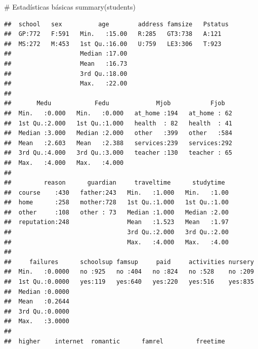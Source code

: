 \documentclass[]{article}
\newenvironment{Shaded}{\begin{snugshade}}{\end{snugshade}}
\newcommand{\CommentTok}[1]{\textcolor[rgb]{0.50,0.62,0.50}{#1}}
\newcommand{\KeywordTok}[1]{\textcolor[rgb]{0.94,0.87,0.69}{#1}}
\newcommand{\NormalTok}[1]{\textcolor[rgb]{0.80,0.80,0.80}{#1}}
\begin{document}
\begin{Shaded}
\begin{Highlighting}[]
\CommentTok{# Estadísticas básicas}
\KeywordTok{summary}\NormalTok{(students)}
\end{Highlighting}
\end{Shaded}

\begin{verbatim}
##  school   sex          age        address famsize   Pstatus
##  GP:772   F:591   Min.   :15.00   R:285   GT3:738   A:121  
##  MS:272   M:453   1st Qu.:16.00   U:759   LE3:306   T:923  
##                   Median :17.00                            
##                   Mean   :16.73                            
##                   3rd Qu.:18.00                            
##                   Max.   :22.00                            
##                                                            
##       Medu            Fedu             Mjob           Fjob    
##  Min.   :0.000   Min.   :0.000   at_home :194   at_home : 62  
##  1st Qu.:2.000   1st Qu.:1.000   health  : 82   health  : 41  
##  Median :3.000   Median :2.000   other   :399   other   :584  
##  Mean   :2.603   Mean   :2.388   services:239   services:292  
##  3rd Qu.:4.000   3rd Qu.:3.000   teacher :130   teacher : 65  
##  Max.   :4.000   Max.   :4.000                                
##                                                               
##         reason      guardian     traveltime      studytime   
##  course    :430   father:243   Min.   :1.000   Min.   :1.00  
##  home      :258   mother:728   1st Qu.:1.000   1st Qu.:1.00  
##  other     :108   other : 73   Median :1.000   Median :2.00  
##  reputation:248                Mean   :1.523   Mean   :1.97  
##                                3rd Qu.:2.000   3rd Qu.:2.00  
##                                Max.   :4.000   Max.   :4.00  
##                                                              
##     failures      schoolsup famsup     paid     activities nursery  
##  Min.   :0.0000   no :925   no :404   no :824   no :528    no :209  
##  1st Qu.:0.0000   yes:119   yes:640   yes:220   yes:516    yes:835  
##  Median :0.0000                                                     
##  Mean   :0.2644                                                     
##  3rd Qu.:0.0000                                                     
##  Max.   :3.0000                                                     
##                                                                     
##  higher    internet  romantic      famrel         freetime    

\end{verbatim}
\end{document}
